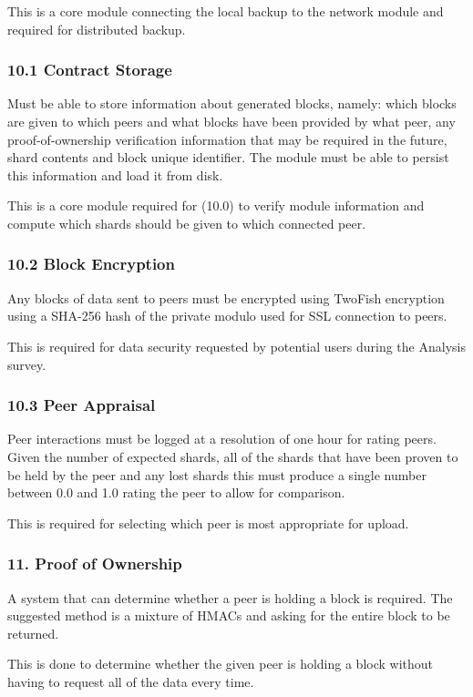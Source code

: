 \documentclass[11pt, a4paper, twoside]{report}
\begin{document}
This is a core module connecting the local backup to the network module and required for distributed backup.

\subsubsection{10.1 Contract Storage}
Must be able to store information about generated blocks, namely: which blocks are given to which peers and what blocks have been provided by what peer, any proof-of-ownership verification information that may be required in the future, shard contents and block unique identifier. The module must be able to persist this information and load it from disk.

This is a core module required for (10.0) to verify module information and compute which shards should be given to which connected peer.

\subsubsection{10.2 Block Encryption}
Any blocks of data sent to peers must be encrypted using TwoFish encryption using a SHA-256 hash of the private modulo used for SSL connection to peers.

This is required for data security requested by potential users during the Analysis survey.

\subsubsection{10.3 Peer Appraisal}

Peer interactions must be logged at a resolution of one hour for rating peers. Given the number of expected shards, all of the shards that have been proven to be held by the peer and any lost shards this must produce a single number between 0.0 and 1.0 rating the peer to allow for comparison.

This is required for selecting which peer is most appropriate for upload.

\subsubsection{11. Proof of Ownership}

A system that can determine whether a peer is holding a block is required. The suggested method is a mixture of HMACs and asking for the entire block to be returned. 

This is done to determine whether the given peer is holding a block without having to request all of the data every time.
\end{document}
